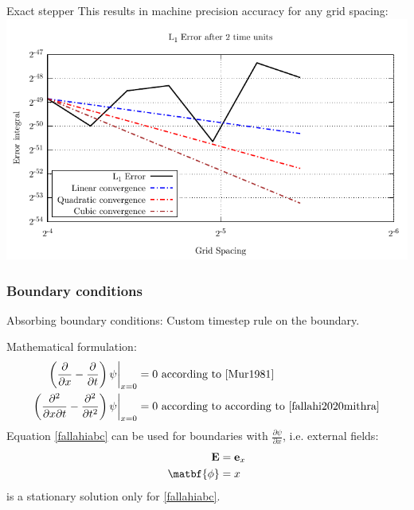 \documentclass[5pt]{beamer}
\begin{document}
\begin{frame}
  {\huge Exact stepper}
  This results in machine precision accuracy for any grid spacing:
  \includegraphics[width=\textwidth]{wave_error_machine.pdf}
\end{frame}
\begin{frame}
\frametitle{Boundary conditions}
Absorbing boundary conditions: Custom timestep rule on the boundary.

\vspace{1em}
Mathematical formulation:
\begin{align}
\left(\frac{\partial}{\partial x} - \frac{\partial}{\partial t}\right)\psi\bigg\rvert_{x = 0} &= 0 \text{ according to \cite{Mur1981}} \\
\vspace{2cm}\left(\frac{\partial^2}{\partial x \partial t} - \frac{\partial^2}{\partial t^2}\right)\psi\bigg\rvert_{x = 0} &= 0 \text{ according to according to \cite{fallahi2020mithra}} \label{fallahiabc}
\end{align}
\pause
Equation \ref{fallahiabc} can be used for boundaries with $\frac{\partial \psi}{\partial x}$, i.e. external fields:
\begin{align*}
\mathbf{E} &= \mathbf{e}_x \\
\matbf{\phi} &= x
\end{align*}
is a stationary solution only for \ref{fallahiabc}.
\end{frame}
\end{document}
